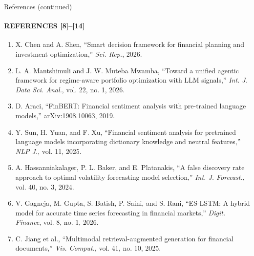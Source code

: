 \documentclass[aspectratio=169,11pt]{beamer}
\begin{document}
\begin{frame}{References (continued)}
  \framesubtitle{REFERENCES [8]--[14]}
  \fontsize{8}{9.2}\selectfont
  \begin{enumerate}\setlength{\itemsep}{3pt}\setcounter{enumi}{7}
    \item X. Chen and A. Shen, ``Smart decision framework for financial planning and investment optimization,'' \emph{Sci. Rep.}, 2026.
    \item L. A. Mantshimuli and J. W. Muteba Mwamba, ``Toward a unified agentic framework for regime-aware portfolio optimization with LLM signals,'' \emph{Int. J. Data Sci. Anal.}, vol. 22, no. 1, 2026.
    \item D. Araci, ``FinBERT: Financial sentiment analysis with pre-trained language models,'' arXiv:1908.10063, 2019.
    \item Y. Sun, H. Yuan, and F. Xu, ``Financial sentiment analysis for pretrained language models incorporating dictionary knowledge and neutral features,'' \emph{NLP J.}, vol. 11, 2025.
    \item A. Hassanniakalager, P. L. Baker, and E. Platanakis, ``A false discovery rate approach to optimal volatility forecasting model selection,'' \emph{Int. J. Forecast.}, vol. 40, no. 3, 2024.
    \item V. Gagneja, M. Gupta, S. Batish, P. Saini, and S. Rani, ``ES-LSTM: A hybrid model for accurate time series forecasting in financial markets,'' \emph{Digit. Finance}, vol. 8, no. 1, 2026.
    \item C. Jiang et al., ``Multimodal retrieval-augmented generation for financial documents,'' \emph{Vis. Comput.}, vol. 41, no. 10, 2025.
  \end{enumerate}
\end{frame}
\end{document}
